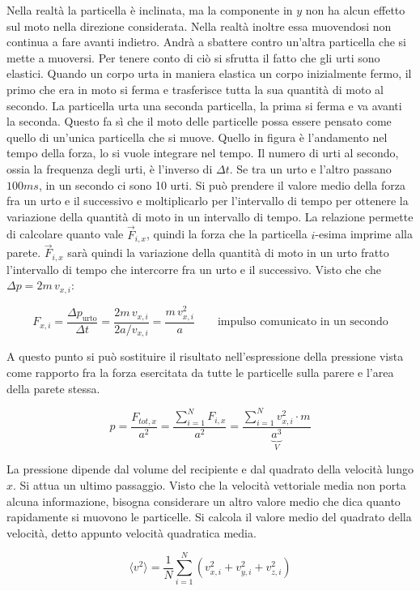 Nella realtà la particella è inclinata, ma la componente in $y$ non ha alcun effetto sul moto nella direzione considerata. Nella realtà inoltre essa muovendosi non continua a fare avanti indietro. Andrà a sbattere contro un'altra particella che si mette a muoversi. Per tenere conto di ciò si sfrutta il fatto che gli urti sono elastici. Quando un corpo urta in maniera elastica un corpo inizialmente fermo, il primo che era in moto si ferma e trasferisce tutta la sua quantità di moto al secondo. La particella urta una seconda particella, la prima si ferma e va avanti la seconda. Questo fa sì che il moto delle particelle possa essere pensato come quello di un'unica particella che si muove. Quello in figura è l'andamento nel tempo della forza, lo si vuole integrare nel tempo. Il numero di urti al secondo, ossia la frequenza degli urti, è l'inverso di $\Delta t$. Se tra un urto e l'altro passano $100 ms$, in un secondo ci sono 10 urti. Si può prendere il valore medio della forza fra un urto e il successivo e moltiplicarlo per l'intervallo di tempo per ottenere la variazione della quantità di moto in un intervallo di tempo. La relazione permette di calcolare quanto vale $\vec{F}_{i,x}$, quindi la forza che la particella $i$-esima imprime alla parete. $\vec{F}_{i,x}$ sarà quindi la variazione della quantità di moto in un urto fratto l'intervallo di tempo che intercorre fra un urto e il successivo.
Visto che che $\Delta p = 2m\,v_{x,i}$:

\[
	F_{x,i} = \frac{\Delta p_{\text{urto} } }{\Delta t} = \frac{2m\,v_{x,i} }{2a/v_{x,i} } = \frac{m\,v_{x,i}^2}{a} \qquad \text{impulso comunicato in un secondo}
\]

A questo punto si può sostituire il risultato nell'espressione della pressione vista come rapporto fra la forza esercitata da tutte le particelle sulla parere e l'area della parete stessa.

\[
	p = \frac{F_{tot,x}}{a^2} = \frac{\sum_{i=1}^N F_{i,x}  }{a^2} = \frac{\sum_{i=1}^N v_{x,i}^2\cdot m}{\underbrace{a^3}_V}
\]

La pressione dipende dal volume del recipiente e dal quadrato della velocità lungo $x$. Si attua un ultimo passaggio. Visto che la velocità vettoriale media non porta alcuna informazione, bisogna considerare un altro valore medio che dica quanto rapidamente si muovono le particelle. Si calcola il valore medio del quadrato della velocità, detto appunto velocità quadratica media.

\[
	\langle v^2 \rangle = \frac{1}{N} \sum_{i=1}^N (v_{x,i}^2 +v_{y,i}^2 + v_{z,i}^2)
\]

